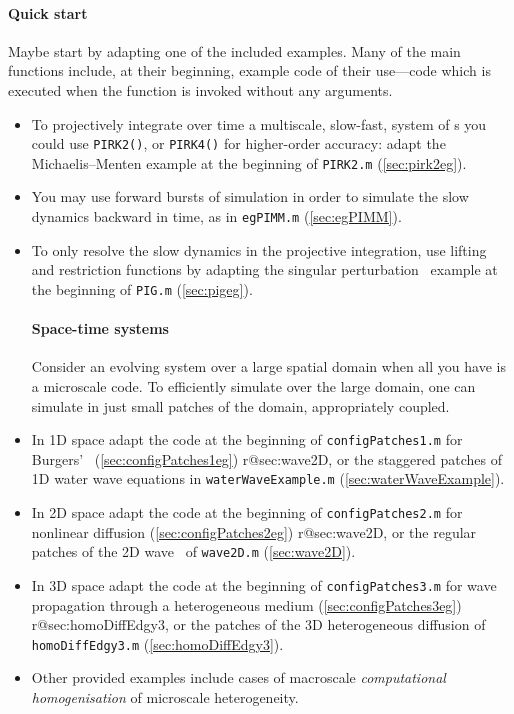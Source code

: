 \paragraph{Quick start}
Maybe start by adapting one of the included examples. 
Many of the main functions include, at their beginning, example code of their use---code which is executed when the function is invoked without any arguments.
\begin{itemize}
\item To projectively integrate over time a multiscale, slow-fast, system of \ode{}s you could use \verb|PIRK2()|, or \verb|PIRK4()| for higher-order accuracy: adapt the Michaelis--Menten example at the beginning of \verb|PIRK2.m| (\cref{sec:pirk2eg}).
\item You may use forward bursts of simulation in order to simulate the slow dynamics backward in time, as in \verb|egPIMM.m| (\cref{sec:egPIMM}).
\item To only resolve the slow dynamics in the projective integration, use lifting and restriction functions by adapting the singular perturbation \ode\ example at the beginning of \verb|PIG.m| (\cref{sec:pigeg}).

\paragraph{Space-time systems}
Consider an evolving system over a large spatial domain when all you have is a microscale code.  
To efficiently simulate over the large domain, one can simulate in just small patches of the domain, appropriately coupled.
\item In 1D space adapt the code at the beginning of \verb|configPatches1.m| for Burgers' \pde\ (\cref{sec:configPatches1eg})%
\ifcsname r@sec:wave2D\endcsname, or the staggered patches of 1D water wave equations in \verb|waterWaveExample.m| (\cref{sec:waterWaveExample})\fi.

\item In 2D space adapt the code at the beginning of \verb|configPatches2.m| for nonlinear diffusion (\cref{sec:configPatches2eg})%
\ifcsname r@sec:wave2D\endcsname, or the regular patches of the 2D wave \pde\ of \verb|wave2D.m| (\cref{sec:wave2D})\fi.

\item In 3D space adapt the code at the beginning of \verb|configPatches3.m| for wave propagation through a heterogeneous medium (\cref{sec:configPatches3eg})%
\ifcsname r@sec:homoDiffEdgy3\endcsname, or the patches of the 3D heterogeneous diffusion of \verb|homoDiffEdgy3.m| (\cref{sec:homoDiffEdgy3})\fi.

\item Other provided examples include cases of macroscale \emph{computational homogenisation} of microscale heterogeneity.
\end{itemize}


